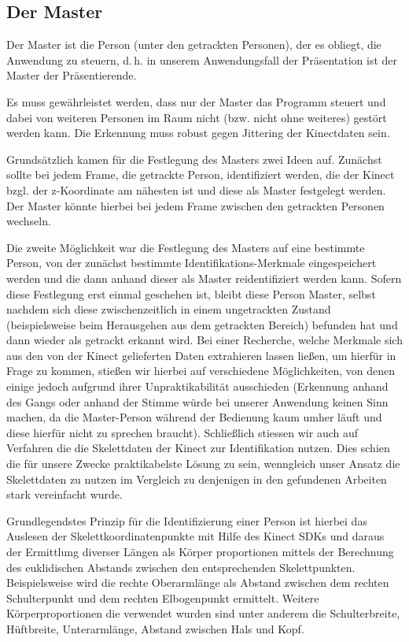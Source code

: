\subsection{Der Master}
	Der Master ist die Person (unter den getrackten Personen), der es obliegt, die Anwendung zu steuern, d.\,h. in unserem Anwendungsfall der Präsentation ist der Master der Präsentierende.\par
	Es muss gewährleistet werden, dass nur der Master das Programm steuert und dabei von weiteren Personen im Raum nicht (bzw. nicht ohne weiteres) gestört werden kann. Die Erkennung muss robust gegen Jittering der Kinectdaten sein.\par
	Grundsätzlich kamen für die Festlegung des Masters zwei Ideen auf. Zunächst sollte bei jedem Frame, die getrackte Person, identifiziert werden, die der Kinect bzgl. der z-Koordinate am nähesten ist und diese als Master festgelegt werden. Der Master könnte hierbei bei jedem Frame zwischen den getrackten Personen wechseln. \par
	Die zweite Möglichkeit war die Festlegung des Masters auf eine bestimmte Person, von der zunächst bestimmte Identifikations-Merkmale eingespeichert werden und die dann anhand dieser als Master reidentifiziert werden kann. Sofern diese Festlegung erst einmal geschehen ist, bleibt diese Person Master, selbst nachdem sich diese zwischenzeitlich in einem ungetrackten Zustand (beispielsweise beim Herausgehen aus dem getrackten Bereich) befunden hat und dann wieder als getrackt erkannt wird. Bei einer Recherche, welche Merkmale sich aus den von der Kinect gelieferten Daten extrahieren lassen ließen, um hierfür in Frage zu kommen, stießen wir hierbei auf verschiedene Möglichkeiten, von denen einige jedoch aufgrund ihrer Unpraktikabilität ausschieden (Erkennung anhand des Gangs oder anhand der Stimme würde bei unserer Anwendung keinen Sinn machen, da die Master-Person während der Bedienung kaum umher läuft und diese hierfür nicht zu sprechen braucht). Schließlich stiessen wir auch auf Verfahren die die Skelettdaten der Kinect zur Identifikation nutzen. Dies schien die für unsere Zwecke praktikabelste Lösung zu sein, wenngleich unser Ansatz die Skelettdaten zu nutzen im Vergleich zu denjenigen in den gefundenen Arbeiten stark vereinfacht wurde.\par
	Grundlegendstes Prinzip für die Identifizierung einer Person ist hierbei das Auslesen der Skelettkoordinatenpunkte mit Hilfe des Kinect SDKs und daraus der Ermittlung diverser Längen als Körper proportionen mittels der Berechnung des euklidischen Abstands zwischen den entsprechenden Skelettpunkten. Beispielsweise wird die rechte Oberarmlänge als Abstand zwischen dem rechten Schulterpunkt und dem rechten Elbogenpunkt ermittelt. Weitere Körperproportionen die verwendet wurden sind unter anderem die Schulterbreite, Hüftbreite, Unterarmlänge, Abstand zwischen Hals und Kopf. \par

